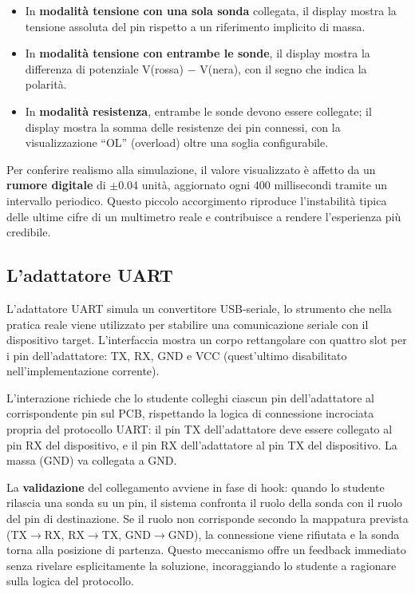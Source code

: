 \begin{itemize}
    \item In \textbf{modalità tensione con una sola sonda} collegata, il display mostra la tensione assoluta del pin rispetto a un riferimento implicito di massa.
    \item In \textbf{modalità tensione con entrambe le sonde}, il display mostra la differenza di potenziale V(rossa) $-$ V(nera), con il segno che indica la polarità.
    \item In \textbf{modalità resistenza}, entrambe le sonde devono essere collegate; il display mostra la somma delle resistenze dei pin connessi, con la visualizzazione ``OL'' (overload) oltre una soglia configurabile.
\end{itemize}

Per conferire realismo alla simulazione, il valore visualizzato è affetto da un \textbf{rumore digitale} di $\pm$0.04 unità, aggiornato ogni 400 millisecondi tramite un intervallo periodico. Questo piccolo accorgimento riproduce l'instabilità tipica delle ultime cifre di un multimetro reale e contribuisce a rendere l'esperienza più credibile.


\subsection{L'adattatore UART}
\label{subsec:adattatore-uart}

L'adattatore UART simula un convertitore USB-seriale, lo strumento che nella pratica reale viene utilizzato per stabilire una comunicazione seriale con il dispositivo target. L'interfaccia mostra un corpo rettangolare con quattro slot per i pin dell'adattatore: TX, RX, GND e VCC (quest'ultimo disabilitato nell'implementazione corrente).

L'interazione richiede che lo studente colleghi ciascun pin dell'adattatore al corrispondente pin sul PCB, rispettando la logica di connessione incrociata propria del protocollo UART: il pin TX dell'adattatore deve essere collegato al pin RX del dispositivo, e il pin RX dell'adattatore al pin TX del dispositivo. La massa (GND) va collegata a GND.

La \textbf{validazione} del collegamento avviene in fase di hook: quando lo studente rilascia una sonda su un pin, il sistema confronta il ruolo della sonda con il ruolo del pin di destinazione. Se il ruolo non corrisponde secondo la mappatura prevista (TX$\rightarrow$RX, RX$\rightarrow$TX, GND$\rightarrow$GND), la connessione viene rifiutata e la sonda torna alla posizione di partenza. Questo meccanismo offre un feedback immediato senza rivelare esplicitamente la soluzione, incoraggiando lo studente a ragionare sulla logica del protocollo.

